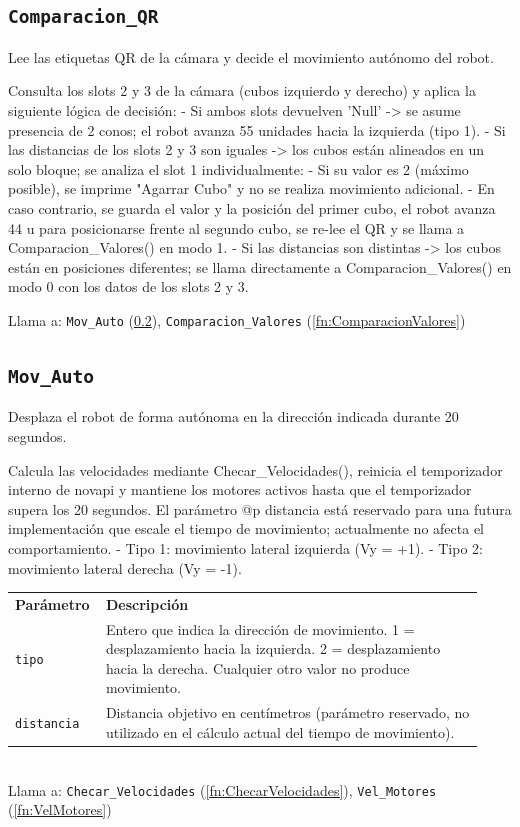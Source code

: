 \subsection{\texttt{Comparacion\_QR}}
\label{fn:ComparacionQR}
Lee las etiquetas QR de la cámara y decide el movimiento autónomo del robot.

Consulta los slots 2 y 3 de la cámara (cubos izquierdo y derecho) y aplica la siguiente lógica de decisión: - Si ambos slots devuelven 'Null' -> se asume presencia de 2 conos; el robot avanza 55 unidades hacia la izquierda (tipo 1). - Si las distancias de los slots 2 y 3 son iguales -> los cubos están alineados en un solo bloque; se analiza el slot 1 individualmente: - Si su valor es 2 (máximo posible), se imprime "Agarrar Cubo" y no se realiza movimiento adicional. - En caso contrario, se guarda el valor y la posición del primer cubo, el robot avanza 44 u para posicionarse frente al segundo cubo, se re-lee el QR y se llama a Comparacion\_Valores() en modo 1. - Si las distancias son distintas -> los cubos están en posiciones diferentes; se llama directamente a Comparacion\_Valores() en modo 0 con los datos de los slots 2 y 3.

Llama a: \texttt{Mov\_Auto} (\ref{fn:MovAuto}), \texttt{Comparacion\_Valores} (\ref{fn:ComparacionValores})\\

\subsection{\texttt{Mov\_Auto}}
\label{fn:MovAuto}
Desplaza el robot de forma autónoma en la dirección indicada durante 20 segundos.

Calcula las velocidades mediante Checar\_Velocidades(), reinicia el temporizador interno de novapi y mantiene los motores activos hasta que el temporizador supera los 20 segundos. El parámetro @p distancia está reservado para una futura implementación que escale el tiempo de movimiento; actualmente no afecta el comportamiento. - Tipo 1: movimiento lateral izquierda  (Vy = +1). - Tipo 2: movimiento lateral derecha    (Vy = -1).

\begin{tabular}{@{}p{0.15\linewidth}p{0.78\linewidth}@{}}
\textbf{Par\'ametro} & \textbf{Descripci\'on} \\
\texttt{tipo} & Entero que indica la dirección de movimiento. 1 = desplazamiento hacia la izquierda. 2 = desplazamiento hacia la derecha. Cualquier otro valor no produce movimiento. \\
\texttt{distancia} & Distancia objetivo en centímetros (parámetro reservado, no utilizado en el cálculo actual del tiempo de movimiento). \\
\end{tabular}\\[4pt]
Llama a: \texttt{Checar\_Velocidades} (\ref{fn:ChecarVelocidades}), \texttt{Vel\_Motores} (\ref{fn:VelMotores})\\

